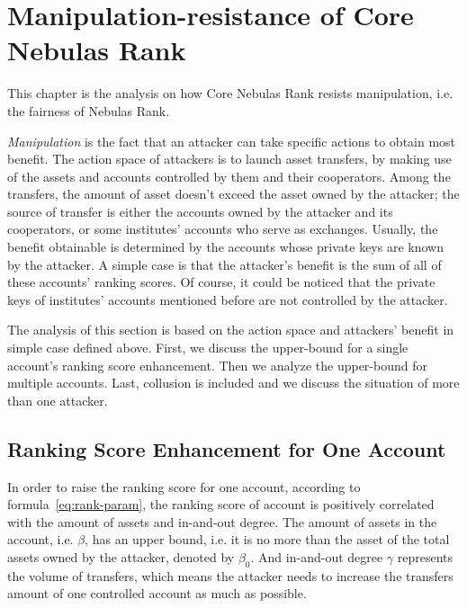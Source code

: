 
\section{Manipulation-resistance of Core Nebulas Rank}

This chapter is the analysis on how Core Nebulas Rank resists manipulation, i.e. the fairness of Nebulas Rank.

\emph{Manipulation} is the fact that an attacker can take specific actions to obtain most benefit. The action space of attackers is to launch asset transfers, by making use of the assets and accounts controlled by them and their cooperators. Among the transfers, the amount of asset doesn't exceed the asset owned by the attacker; the source of transfer is either the accounts owned by the attacker and its cooperators, or some institutes' accounts who serve as exchanges. Usually, the benefit obtainable is determined by the accounts whose private keys are known by the attacker. A simple case is that the attacker's benefit is the sum of all of these accounts' ranking scores. Of course, it could be noticed that the private keys of institutes' accounts mentioned before are not controlled by the attacker.

The analysis of this section is based on the action space and attackers' benefit in simple case defined above. First, we discuss the upper-bound for a single account's ranking score enhancement. Then we analyze the upper-bound for multiple accounts. Last, collusion is included and we discuss the situation of more than one attacker.

\subsection{Ranking Score Enhancement for One Account \label{sec:cheat-single}}

In order to raise the ranking score for one account, according to formula~\ref{eq:rank-param}, the ranking score of account is positively correlated with the amount of assets and in-and-out degree. The amount of assets in the account, i.e. $\beta$, has an upper bound, i.e. it is no more than the asset of the total assets owned by the attacker, denoted by $\beta_0$. And in-and-out degree $\gamma$ represents the volume of transfers, which means the attacker needs to increase the transfers amount of one controlled account as much as possible.

